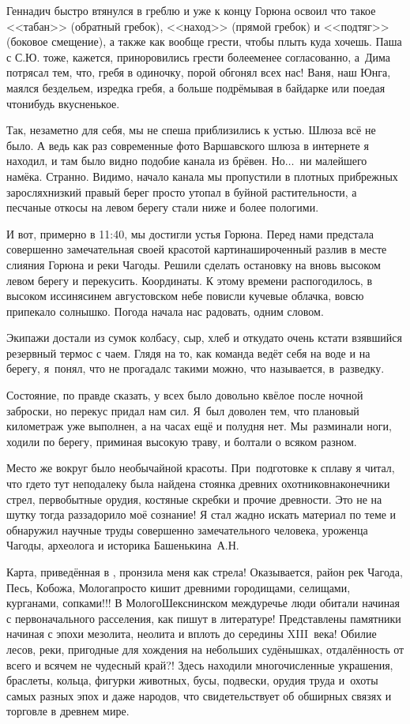 Геннадич быстро втянулся в греблю и уже к концу Горюна освоил что такое <<табан>> (обратный гребок), <<наход>> (прямой гребок) и <<подтяг>> (боковое смещение), а также как вообще грести, чтобы плыть куда хочешь. Паша с С.Ю. тоже, кажется, приноровились грести более\sdash менее согласованно, а~Дима потрясал тем, что, гребя в одиночку, порой обгонял всех нас! Ваня, наш Юнга, маялся бездельем, изредка гребя, а больше подрёмывая в байдарке или поедая что\sdash нибудь вкусненькое. 

Так, незаметно для себя, мы не спеша приблизились к устью. Шлюза всё не было. А ведь как раз современные фото Варшавского шлюза в интернете я находил, и там было видно подобие канала из брёвен. Но$\ldots$~ни малейшего намёка. Странно. Видимо, начало канала мы пропустили в плотных прибрежных зарослях\mdash низкий правый берег просто утопал в буйной растительности, а песчаные откосы на левом берегу стали ниже и более пологими. 

И вот, примерно в 11:40, мы достигли устья Горюна. Перед нами предстала совершенно замечательная своей красотой картина\mdash широченный разлив в месте слияния Горюна и реки Чагоды. Решили сделать остановку на вновь высоком левом берегу и перекусить. Координаты\mdash \CoordsGorunSixteenUstie. К этому времени распогодилось, в высоком иссиня\sdash синем августовском небе повисли кучевые облачка, вовсю припекало солнышко. Погода начала нас радовать, одним словом. 

Экипажи достали из сумок колбасу, сыр, хлеб и откуда\sdash то очень кстати взявшийся резервный термос с чаем. Глядя на то, как команда ведёт себя на воде и на берегу, я~понял, что не прогадал\mdash с такими можно, что называется, в~разведку. 

Состояние, по правде сказать, у всех было довольно квёлое после ночной заброски, но перекус придал нам сил. Я~был доволен тем, что плановый километраж уже выполнен, а на часах ещё и полудня нет. Мы~разминали ноги, ходили по берегу, приминая высокую траву, и болтали о всяком разном.

Место же вокруг было необычайной красоты. При~подготовке к сплаву я читал, что где\sdash то тут неподалеку была найдена стоянка древних охотников\mdash наконечники стрел, первобытные орудия, костяные скребки и прочие древности. Это не на шутку тогда раззадорило моё сознание! Я стал жадно искать материал по теме и обнаружил научные труды совершенно замечательного человека, уроженца Чагоды, археолога и историка Башенькина~А.Н. 

Карта, приведённая в \cite{БашенькинМологоШекснинскоеМеждуречье}, пронзила меня как стрела! Оказывается, район рек Чагода, Песь, Кобожа, Молога\mdash просто кишит древними городищами, селищами, курганами, сопками!!! В Молого\sdash Шекснинском междуречье люди обитали начиная с первоначального расселения, как пишут в литературе! Представлены памятники начиная с эпохи мезолита, неолита и вплоть до середины XIII~века! Обилие лесов, реки, пригодные для хождения на небольших судёнышках, отдалённость от всего и вся\mdash чем не чудесный край?! Здесь находили многочисленные украшения, браслеты, кольца, фигурки животных, бусы, подвески, орудия труда и~охоты самых разных эпох и даже народов, что свидетельствует об обширных связях и торговле в древнем мире.

